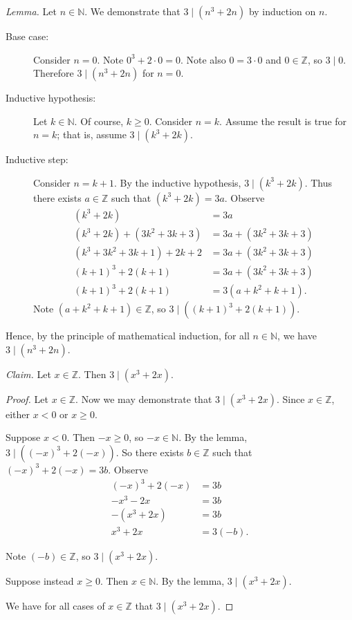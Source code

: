 \documentclass{article}
\newcommand{\Z}{\mathbb{Z}}
\theoremstyle{definition}
\begin{document}
\begin{solution}
\newline

\noindent\textit{Lemma. }Let $n\in\mathbb{N}$. We demonstrate that $3\mid\left(n^3+2n\right)$ by induction on $n$.
\begin{description}
    \item[Base case: ] Consider $n=0$. Note $0^3+2\cdot 0=0$. Note also $0=3\cdot 0$ and $0\in\Z$, so $3\mid 0$. Therefore $3\mid\left(n^3+2n\right)$ for $n=0$.
    \item[Inductive hypothesis: ] Let $k\in\mathbb{N}$. Of course, $k\geq 0$. Consider $n=k$. Assume the result is true for $n=k$; that is, assume $3\mid\left(k^3+2k\right)$.
    \item[Inductive step: ] Consider $n=k+1$. By the inductive hypothesis, $3\mid\left(k^3+2k\right)$. Thus there exists $a\in\Z$ such that $\left(k^3+2k\right)=3a$. Observe
    \begin{align*}
    \left(k^3+2k\right)&=3a\\
    \left(k^3+2k\right)+\left(3k^2+3k+3\right)&=3a+\left(3k^2+3k+3\right)\\
    \left(k^3+3k^2+3k+1\right)+2k+2&=3a+\left(3k^2+3k+3\right)\\
    \left(k+1\right)^3+2(k+1)&=3a+\left(3k^2+3k+3\right)\\
    \left(k+1\right)^3+2(k+1)&=3\left(a+k^2+k+1\right).
    \end{align*}
    Note $\left(a+k^2+k+1\right)\in\Z$, so $3\mid\left((k+1)^3+2(k+1)\right)$.
\end{description}
Hence, by the principle of mathematical induction, for all $n\in\mathbb{N}$, we have $3\mid\left(n^3+2n\right)$.
\newline
\newline

\noindent\textit{Claim. }Let $x\in\Z$. Then $3\mid\left(x^3+2x\right)$.

\begin{proof}
Let $x\in\Z$. Now we may demonstrate that $3\mid\left(x^3+2x\right)$. Since $x\in\Z$, either $x<0$ or $x\geq 0$.
\newline

Suppose $x<0$. Then $-x\geq 0$, so $-x\in\mathbb{N}$. By the lemma, $3\mid\left((-x)^3+2(-x)\right)$. So there exists $b\in\mathbb{Z}$ such that $(-x)^3+2(-x)=3b$. Observe 
\begin{align*}
(-x)^3+2(-x)&=3b\\
-x^3-2x&=3b\\
-(x^3+2x)&=3b\\
x^3+2x&=3(-b).
\end{align*}

Note $(-b)\in\Z$, so $3\mid\left(x^3+2x\right)$.
\newline

Suppose instead $x\geq 0$. Then $x\in\mathbb{N}$. By the lemma, $3\mid\left(x^3+2x\right)$.
\newline

\noindent We have for all cases of $x\in\Z$ that $3\mid\left(x^3+2x\right)$.
\end{proof}
\end{solution}
\end{document}
